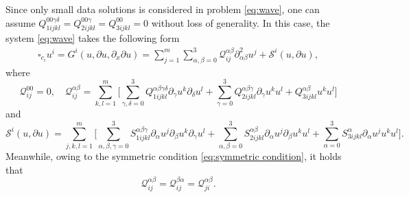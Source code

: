 \documentclass[11pt,twoside]{article}
\def\cQ{\mathcal Q}
\def\p{\partial}
\theoremstyle{plain}
\theoremstyle{definition}
\numberwithin{equation}{section}
\begin{document}
Since only small data solutions is considered in problem \eqref{eq:wave},
one can assume $Q^{00\gamma\delta}_{1ijkl}=Q^{00\gamma}_{2ijkl}=Q^{00}_{3ijkl}=0$ without loss of generality.
In this case, the system \eqref{eq:wave} takes the following form
\begin{equation}\label{eq:wave2}
	\begin{aligned}
		\square_{c_i} u^i =G^i(u,\p u,\p_x\p u) = \sum_{j=1}^m\sum_{\alpha,\beta=0}^3 \cQ^{\alpha\beta}_{ij} \partial_{\alpha\beta}^2 u^j+\mathcal{S}^i(u,\p u),
	\end{aligned}
\end{equation}
where
\begin{equation}\label{3.102}
\cQ^{00}_{ij}=0,\quad	\cQ^{\alpha\beta}_{ij}
	=\sum_{k,l=1}^m \big[\sum_{\gamma,\delta=0}^{3} Q^{\alpha\beta\gamma\delta}_{1ijkl}\partial_\gamma u^k \partial_\delta u^l
	+\sum_{\gamma=0}^{3} Q^{\alpha\beta\gamma}_{2ijkl}\partial_\gamma u^k  u^l
	+Q^{\alpha\beta}_{3ijkl} u^k  u^l\big]
\end{equation}
and
\begin{equation}
\mathcal{S}^i(u,\p u)=\sum_{j,k,l=1}^m\big[\sum_{\alpha,\beta,\gamma=0}^3S^{\alpha\beta\gamma}_{1ijkl}\partial_{\alpha} u^j\partial_\beta u^k  \partial_\gamma u^l+\sum_{\alpha,\beta=0}^3 S^{\alpha\beta}_{2ijkl}\partial_{\alpha}u^j\partial_\beta u^k  u^l
+\sum_{\alpha=0}^3 S^{\alpha}_{3ijkl}\partial_{\alpha} u^j  u^k  u^l\big].		
\end{equation}
Meanwhile, owing to the symmetric condition \eqref{eq:symmetric condition}, it holds that
\begin{equation}\label{eq:symmetric condition2}
	\cQ^{\alpha\beta}_{ij} =\cQ^{\beta\alpha}_{ij} =\cQ^{\alpha\beta}_{ji}.
\end{equation}
\end{document}
